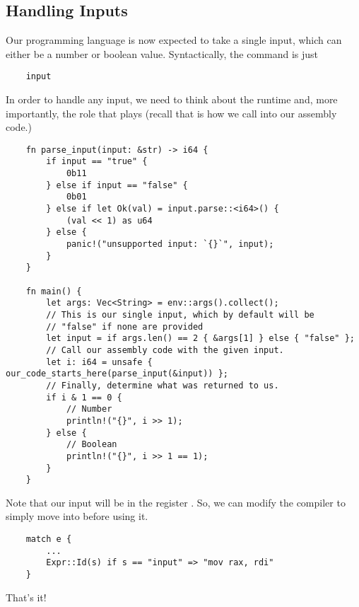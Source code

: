 \subsection{Handling Inputs}
Our programming language is now expected to take a single input, which can either be a number or boolean value. Syntactically, the command is just 
\begin{verbatim}
    input \end{verbatim}
In order to handle any input, we need to think about the runtime and, more importantly, the role that  plays (recall that  is how we call into our assembly code.)
\begin{verbatim}
    fn parse_input(input: &str) -> i64 {
        if input == "true" {
            0b11
        } else if input == "false" {
            0b01
        } else if let Ok(val) = input.parse::<i64>() {
            (val << 1) as u64
        } else {
            panic!("unsupported input: `{}`", input);
        }
    }

    fn main() {
        let args: Vec<String> = env::args().collect();
        // This is our single input, which by default will be 
        // "false" if none are provided
        let input = if args.len() == 2 { &args[1] } else { "false" };
        // Call our assembly code with the given input.
        let i: i64 = unsafe { our_code_starts_here(parse_input(&input)) };
        // Finally, determine what was returned to us.
        if i & 1 == 0 {
            // Number
            println!("{}", i >> 1);
        } else {
            // Boolean
            println!("{}", i >> 1 == 1);
        }
    }\end{verbatim}
Note that our input will be in the register . So, we can modify the compiler to simply move  into  before using it. 
\begin{verbatim}
    match e {
        ... 
        Expr::Id(s) if s == "input" => "mov rax, rdi"
    }\end{verbatim}
That's it!


